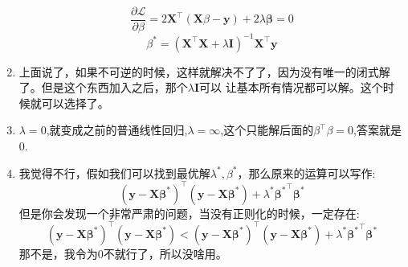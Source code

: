 \documentclass[answers]{exam}  %
\begin{document}
\begin{enumerate}[label=\alph*.]
\begin{equation*}
        \frac{\partial \mathcal{L}}{\partial \beta} = 2\mathbf{X}^\top (\mathbf{X}\beta - \mathbf{y}) + 2\lambda \mathbf{\beta}= 0
    \end{equation*}
    \begin{equation*}
        \beta^* = (\mathbf{X}^\top\mathbf{X} + \lambda \mathbf{I})^{-1} \mathbf{X}^\top \mathbf{y}
    \end{equation*}
    \item 上面说了，如果不可逆的时候，这样就解决不了了，因为没有唯一的闭式解了。但是这个东西加入之后，那个$\lambda\mathbf{I}$可以
    让基本所有情况都可以解。这个时候就可以选择了。
    \item $\lambda=0$,就变成之前的普通线性回归,$\lambda=\infty$,这个只能解后面的$\beta^\top\beta = 0$,答案就是0.
    \item 我觉得不行，假如我们可以找到最优解$\lambda^*, \beta^*$，那么原来的运算可以写作:
    \begin{equation*}
        (\mathbf{y} - \mathbf{X} \mathbf{\beta^*})^\top (\mathbf{y} - \mathbf{X} \mathbf{\beta^*}) + \lambda^* \mathbf{\beta^*}^\top \mathbf{\beta^*}
    \end{equation*}
    但是你会发现一个非常严肃的问题，当没有正则化的时候，一定存在:
    \begin{equation*}
        (\mathbf{y} - \mathbf{X} \mathbf{\beta^*})^\top (\mathbf{y} - \mathbf{X} \mathbf{\beta^*}) < (\mathbf{y} - \mathbf{X} \mathbf{\beta^*})^\top (\mathbf{y} - \mathbf{X} \mathbf{\beta^*}) + \lambda^* \mathbf{\beta^*}^\top \mathbf{\beta^*}
    \end{equation*}
    那不是，我令为0不就行了，所以没啥用。
\end{enumerate}
\end{document}
